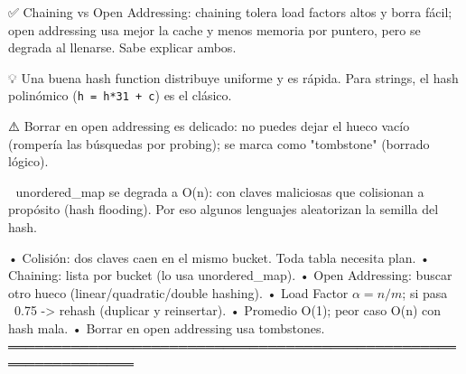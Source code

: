 \begin{dsaentrevistas}

✅ Chaining vs Open Addressing: chaining tolera load factors altos y
   borra fácil; open addressing usa mejor la cache y menos memoria por
   puntero, pero se degrada al llenarse. Sabe explicar ambos.

💡 Una buena hash function distribuye uniforme y es rápida. Para strings,
   el hash polinómico (\verb|h = h*31 + c|) es el clásico.

⚠️ Borrar en open addressing es delicado: no puedes dejar el hueco
   vacío (rompería las búsquedas por probing); se marca como "tombstone"
   (borrado lógico).

🔑 unordered\_map se degrada a O(n): con claves maliciosas que colisionan
   a propósito (hash flooding). Por eso algunos lenguajes aleatorizan la
   semilla del hash.

\end{dsaentrevistas}

\begin{dsaresumen}

• Colisión: dos claves caen en el mismo bucket. Toda tabla necesita plan.
• Chaining: lista por bucket (lo usa unordered\_map).
• Open Addressing: buscar otro hueco (linear/quadratic/double hashing).
• Load Factor $\alpha = n/m$; si pasa ~0.75 -> rehash (duplicar y reinsertar).
• Promedio O(1); peor caso O(n) con hash mala.
• Borrar en open addressing usa tombstones.
════════════════════════════════════════════════════════════════

\end{dsaresumen}
